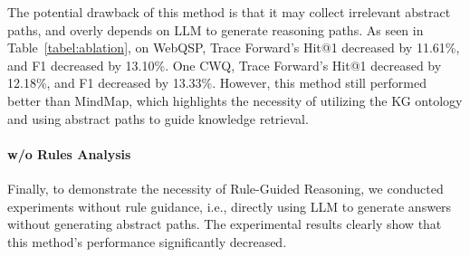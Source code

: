 The potential drawback of this method is that it may collect irrelevant abstract paths, and overly depends on LLM to generate reasoning paths. As seen in Table~\ref{tabel:ablation}, on WebQSP, Trace Forward's Hit@1 decreased by 11.61\%, and F1 decreased by 13.10\%. One CWQ, Trace Forward's Hit@1 decreased by 12.18\%, and F1 decreased by 13.33\%. However, this method still performed better than MindMap, which highlights the necessity of utilizing the KG ontology and using abstract paths to guide knowledge retrieval.

\paragraph{w/o Rules Analysis}Finally, to demonstrate the necessity of Rule-Guided Reasoning, we conducted experiments without rule guidance, i.e., directly using LLM to generate answers without generating abstract paths. The experimental results clearly show that this method's performance significantly decreased.